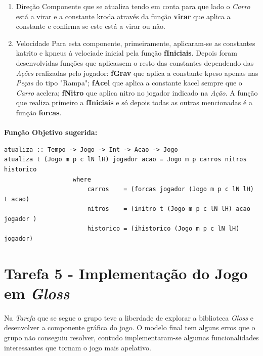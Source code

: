 \documentclass[12pt,a4paper]{report}
\begin{document}
\begin{enumerate}
\item Direção 
\newline Componente que se atualiza tendo em conta para que lado o \textit{Carro} está a virar e a constante k\textunderscore roda através da função \textbf{virar} que aplica a constante e confirma se este está a virar ou não.
\item Velocidade
\newline Para esta componente, primeiramente, aplicaram-se as constantes k\textunderscore atrito e k\textunderscore pneus à velociade inicial pela função \textbf{fIniciais}. Depois foram desenvolvidas funções que aplicassem o resto das constantes dependendo das \textit{Ações} realizadas pelo jogador: \textbf{fGrav} que aplica a constante k\textunderscore peso apenas nas \textit{Peças} do tipo "Rampa"; \textbf{fAcel} que aplica a constante k\textunderscore acel sempre que o \textit{Carro} acelera; \textbf{fNitro} que aplica nitro no jogador indicado na \textit{Ação}.
\newline A função que realiza primeiro a \textbf{fIniciais} e só depois todas as outras mencionadas é a função \textbf{forcas}.
\end{enumerate}

\paragraph{}\textbf{Função Objetivo sugerida:}

\begin{verbatim}
atualiza :: Tempo -> Jogo -> Int -> Acao -> Jogo
atualiza t (Jogo m p c lN lH) jogador acao = Jogo m p carros nitros historico
                   where
                       carros    = (forcas jogador (Jogo m p c lN lH) t acao)
                       nitros    = (initro t (Jogo m p c lN lH) acao jogador )
                       historico = (ihistorico (Jogo m p c lN lH) jogador)

\end{verbatim}


\newpage
\section{Tarefa 5 - Implementação do Jogo em \textit{Gloss}}
\label{Tarefa5_2017li1g77}

\paragraph{} Na \textit{Tarefa} que se segue o grupo teve a liberdade de explorar a biblioteca \textit{Gloss} e desenvolver a componente gráfica do jogo. 
\newline O modelo final tem alguns erros que o grupo não conseguiu resolver, contudo implementaram-se  algumas funcionalidades interessantes que tornam o jogo mais apelativo.
\end{document}
